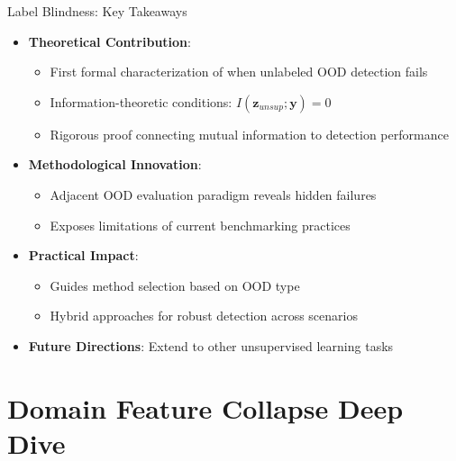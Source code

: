 \documentclass[aspectratio=169]{beamer}
\begin{document}
\begin{frame}{Label Blindness: Key Takeaways}
\begin{itemize}
    \item \textbf{Theoretical Contribution}:
    \begin{itemize}
        \item First formal characterization of when unlabeled OOD detection fails
        \item Information-theoretic conditions: $I(\mathbf{z}_{unsup}; \mathbf{y}) = 0$
        \item Rigorous proof connecting mutual information to detection performance
    \end{itemize}
    \item \textbf{Methodological Innovation}:
    \begin{itemize}
        \item Adjacent OOD evaluation paradigm reveals hidden failures
        \item Exposes limitations of current benchmarking practices
    \end{itemize}
    \item \textbf{Practical Impact}:
    \begin{itemize}
        \item Guides method selection based on OOD type
        \item Hybrid approaches for robust detection across scenarios
    \end{itemize}
    \item \textbf{Future Directions}: Extend to other unsupervised learning tasks
\end{itemize}
\end{frame}

\section{Domain Feature Collapse Deep Dive}
\end{document}
